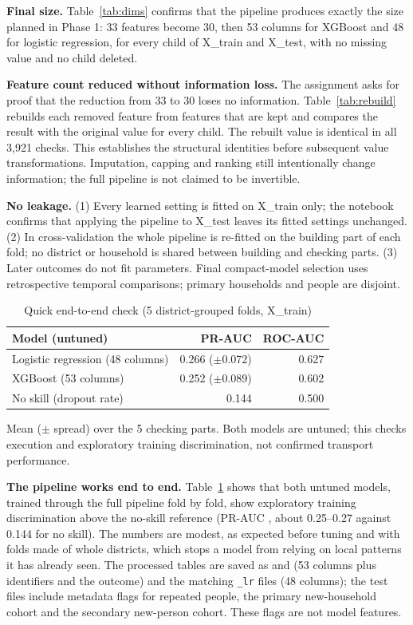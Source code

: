 \documentclass[conference,a4paper]{IEEEtran}
\newcommand{\var}[1]{\texttt{#1}}
\newcommand{\tabnote}[1]{\par\vspace{3pt}\begin{minipage}{\linewidth}\footnotesize\raggedright #1\end{minipage}}
\begin{document}
\textbf{Final size.} Table~\ref{tab:dims} confirms that the pipeline produces exactly the size planned in Phase 1: 33 features become 30, then 53 columns for XGBoost and 48 for logistic regression, for every child of X\_train and X\_test, with no missing value and no child deleted.

\textbf{Feature count reduced without information loss.} The assignment asks for proof that the reduction from 33 to 30 loses no information. Table~\ref{tab:rebuild} rebuilds each removed feature from features that are kept and compares the result with the original value for every child. The rebuilt value is identical in all 3,921 checks. This establishes the structural identities before subsequent value transformations. Imputation, capping and ranking still intentionally change information; the full pipeline is not claimed to be invertible.

\textbf{No leakage.} (1) Every learned setting is fitted on X\_train only; the notebook confirms that applying the pipeline to X\_test leaves its fitted settings unchanged. (2) In cross-validation the whole pipeline is re-fitted on the building part of each fold; no district or household is shared between building and checking parts. (3) Later outcomes do not fit parameters. Final compact-model selection uses retrospective temporal comparisons; primary households and people are disjoint.

\begin{table}[!t]
\centering
\caption{Quick end-to-end check (5 district-grouped folds, X\_train)}
\label{tab:cv}
\footnotesize
\setlength{\tabcolsep}{4pt}
\begin{tabular}{lrr}
\toprule
Model (untuned) & PR-AUC & ROC-AUC \\
\midrule
Logistic regression (48 columns) & 0.266 ($\pm$0.072) & 0.627 \\
XGBoost (53 columns) & 0.252 ($\pm$0.089) & 0.602 \\
No skill (dropout rate) & 0.144 & 0.500 \\
\bottomrule
\end{tabular}
\tabnote{Mean ($\pm$ spread) over the 5 checking parts. Both models are untuned; this checks execution and exploratory training discrimination, not confirmed transport performance.}
\end{table}

\textbf{The pipeline works end to end.} Table~\ref{tab:cv} shows that both untuned models, trained through the full pipeline fold by fold, show exploratory training discrimination above the no-skill reference (PR-AUC \cite{saito2015}, about 0.25--0.27 against 0.144 for no skill). The numbers are modest, as expected before tuning and with folds made of whole districts, which stops a model from relying on local patterns it has already seen. The processed tables are saved as  and  (53 columns plus identifiers and the outcome) and the matching \var{\_lr} files (48 columns); the test files include metadata flags for repeated people, the primary new-household cohort and the secondary new-person cohort. These flags are not model features.
\end{document}

